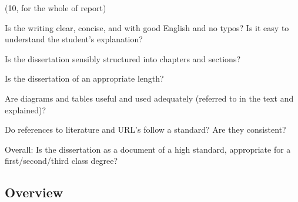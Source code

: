 (10, for the whole of report)

Is the writing clear, concise, and with good English and no typos? Is it easy
to understand the student’s explanation?

Is the dissertation sensibly structured into chapters and sections?

Is the dissertation of an appropriate length?

Are diagrams and tables useful and used adequately (referred to in the text and
explained)?

Do references to literature and URL’s follow a standard? Are they consistent?

Overall: Is the dissertation as a document of a high standard, appropriate for
a first/second/third class degree?

\subsection{Overview}
